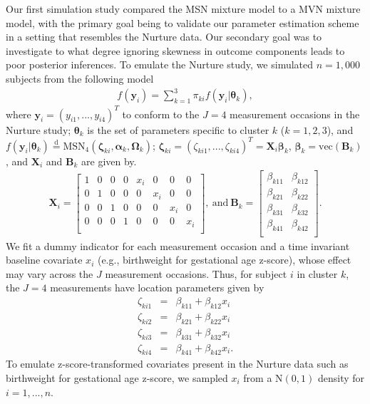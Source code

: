 \documentclass[useAMS,referee]{biom}
\begin{document}
Our first simulation study compared the MSN mixture model to a MVN mixture model, with the primary goal being to validate our parameter estimation scheme in a setting that resembles the Nurture data. Our secondary goal was to investigate to what degree ignoring skewness in outcome components leads to poor posterior inferences. To emulate the Nurture study, we simulated $n = 1,000$ subjects from the following model
\begin{eqnarray}
	\label{eq:sim1}
	f(\mathbf{y}_i) = \sum_{k = 1}^3 \pi_{ki} f(\mathbf{y}_i | \boldsymbol\theta_k),
\end{eqnarray}
where $\mathbf{y}_i = (y_{i1},...,y_{i4})^T$ to conform to the $J = 4$ measurement occasions in the Nurture study; $\boldsymbol\theta_k$ is the set of parameters specific to cluster $k$ ($k = 1,2,3$), and $f(\mathbf{y}_i | \boldsymbol\theta_k) \stackrel{\text{d}}{=} \text{MSN}_4(\boldsymbol\zeta_{ki},\boldsymbol\alpha_k,\boldsymbol\Omega_k)$; $\boldsymbol\zeta_{ki} = (\zeta_{ki1},...,\zeta_{ki4})^T = \mathbf{X}_i \boldsymbol\beta_{k}$, $\boldsymbol\beta_k = \text{vec}(\mathbf{B}_k)$, and $\mathbf{X}_i$ and $\mathbf{B}_k$ are given by. 
\begin{eqnarray}
	\mathbf{X}_i = 
	\begin{bmatrix}
		1 & 0 & 0 & 0 & x_i & 0 & 0 & 0\\
		0 & 1 & 0 & 0 & 0 & x_i & 0 & 0\\
		0 & 0 & 1 & 0 & 0 & 0 & x_i & 0\\
		0 & 0 & 0 & 1 & 0 & 0 & 0 & x_i\\
	\end{bmatrix}, \ \text{and} \ 
	\mathbf{B}_k = 
	\begin{bmatrix}
		\beta_{k11} & \beta_{k12} \\
		\beta_{k21} & \beta_{k22} \\
		\beta_{k31} & \beta_{k32} \\
		\beta_{k41} & \beta_{k42} \\
	\end{bmatrix}. \nonumber
\end{eqnarray}
We fit a dummy indicator for each measurement occasion and a time invariant baseline covariate $x_i$ (e.g., birthweight for gestational age z-score), whose effect may vary across the $J$ measurement occasions. Thus, for subject $i$ in cluster $k$, the $J = 4$ measurements have location parameters given by
\begin{eqnarray}
	\zeta_{ki1} &=& \beta_{k11} + \beta_{k12}x_i \nonumber \\
	\zeta_{ki2} &=& \beta_{k21} + \beta_{k22}x_i \nonumber \\
	\zeta_{ki3} &=& \beta_{k31} + \beta_{k32}x_i \nonumber \\
	\zeta_{ki4} &=& \beta_{k41} + \beta_{k42}x_i. \nonumber 
\end{eqnarray}
To emulate z-score-transformed covariates present in the Nurture data such as birthweight for gestational age z-score, we sampled $x_i$ from a $\text{N}(0,1)$ density for $i = 1,...,n$.
\end{document}
